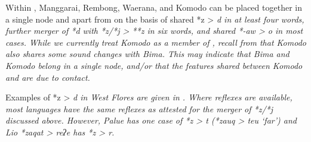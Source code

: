 Within ,
Manggarai, Rembong, Waerana, and Komodo can be placed together
in a single node
and apart from  on the basis of shared *z
> \it{d} in at least four words,
further merger of *d with *z/*j > **z in six words,
and shared *-aw > \it{o} in most cases.
While we currently treat Komodo as a member of ,
recall from  that Komodo also shares some sound changes with Bima.
This may indicate that Bima
and Komodo belong in a single node,
and/or that the features shared between Komodo
and  are due to contact.

Examples of *z > \it{d} in West Flores are given in .
Where reflexes are available,
most  languages have the same reflexes as
attested for the merger of *z/*j discussed above.
However, Palu{\Q}e has one case of *z > \it{t} (*zauq > \it{teu}
‘far’) and Lio *zaqat > \it{reʔe} has *z > \it{r}.

